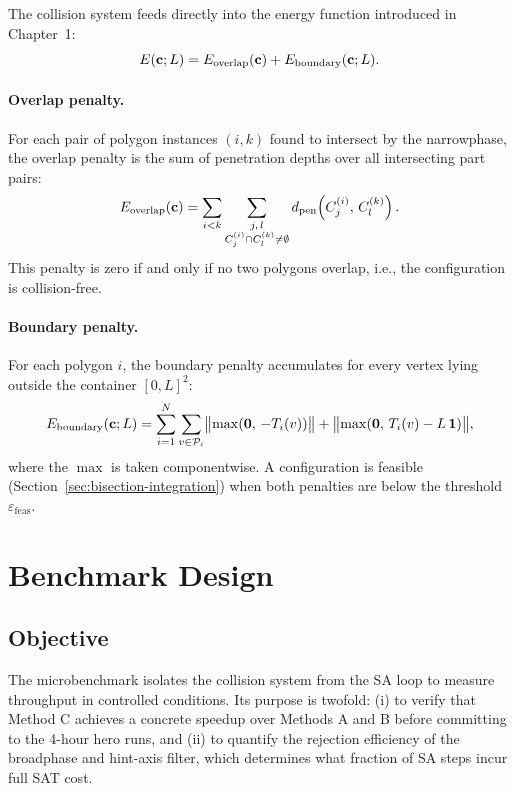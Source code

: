The collision system feeds directly into the energy function introduced
in Chapter~1:
\[
  E(\mathbf{c}; L) = E_{\mathrm{overlap}}(\mathbf{c}) + E_{\mathrm{boundary}}(\mathbf{c}; L).
\]

\paragraph{Overlap penalty.}
For each pair of polygon instances $(i, k)$ found to intersect by the
narrowphase, the overlap penalty is the sum of penetration depths over
all intersecting part pairs:
\[
  E_{\mathrm{overlap}}(\mathbf{c})
  = \sum_{i < k} \sum_{\substack{j,\, l \\ C_j^{(i)} \cap C_l^{(k)} \neq \emptyset}}
    d_{\mathrm{pen}}\!\left(C_j^{(i)},\, C_l^{(k)}\right).
\]
This penalty is zero if and only if no two polygons overlap, i.e., the
configuration is collision-free.

\paragraph{Boundary penalty.}
For each polygon $i$, the boundary penalty accumulates for every
vertex lying outside the container $[0, L]^2$:
\[
  E_{\mathrm{boundary}}(\mathbf{c}; L)
  = \sum_{i=1}^N \sum_{v \in \mathcal{P}_i}
    \bigl\| \max(\mathbf{0},\, -T_i(v)) \bigr\|
    + \bigl\| \max(\mathbf{0},\, T_i(v) - L\,\mathbf{1}) \bigr\|,
\]
where the $\max$ is taken componentwise.
A configuration is feasible (Section~\ref{sec:bisection-integration})
when both penalties are below the threshold
$\varepsilon_{\mathrm{feas}}$.

\section{Benchmark Design}
\label{sec:bench}

\subsection{Objective}

The microbenchmark isolates the collision system from the SA loop
to measure throughput in controlled conditions. Its purpose is twofold:
(i) to verify that Method C achieves a concrete speedup over Methods A
and B before committing to the 4-hour hero runs, and (ii) to quantify
the rejection efficiency of the broadphase and hint-axis filter, which
determines what fraction of SA steps incur full SAT cost.

